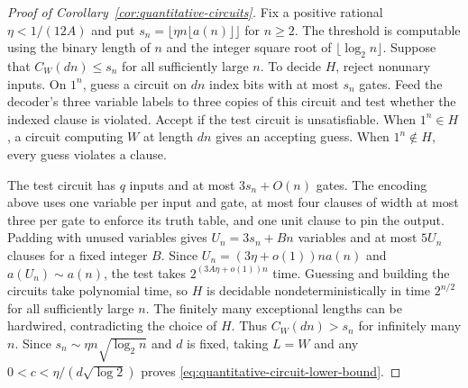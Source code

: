 \begin{proof}[Proof of Corollary~\ref{cor:quantitative-circuits}]
Fix a positive rational $\eta<1/(12A)$ and put
$s_n=\lfloor\eta n\lfloor a(n)\rfloor\rfloor$ for $n\ge2$.
The threshold is computable using the binary length of $n$ and the
integer square root of $\lfloor\log_2 n\rfloor$. Suppose that
$C_W(dn)\le s_n$ for all sufficiently large $n$. To decide $H$,
reject nonunary inputs. On $1^n$, guess a circuit on $dn$ index bits
with at most $s_n$ gates. Feed the decoder's three variable labels to
three copies of this circuit and test whether the indexed clause is
violated. Accept if the test circuit is unsatisfiable. When
$1^n\in H$, a circuit computing $W$ at length $dn$ gives an
accepting guess. When $1^n\notin H$, every guess violates a clause.

The test circuit has $q$ inputs and at most $3s_n+O(n)$ gates. The
encoding above uses one variable per input and gate, at most four
clauses of width at most three per gate to enforce its truth table,
and one unit clause to pin the output. Padding with unused variables
gives $U_n=3s_n+Bn$ variables and at most $5U_n$ clauses for a fixed
integer $B$. Since $U_n=(3\eta+o(1))n a(n)$ and $a(U_n)\sim a(n)$,
the test takes $2^{(3A\eta+o(1))n}$ time. Guessing and building the
circuits take polynomial time, so $H$ is decidable nondeterministically
in time $2^{n/2}$ for all sufficiently large $n$. The finitely many
exceptional lengths can be hardwired, contradicting the choice of $H$.
Thus $C_W(dn)>s_n$ for infinitely many $n$. Since
$s_n\sim\eta n\sqrt{\log_2 n}$ and $d$ is fixed, taking $L=W$ and any
$0<c<\eta/(d\sqrt{\log 2})$ proves \eqref{eq:quantitative-circuit-lower-bound}.
\end{proof}
